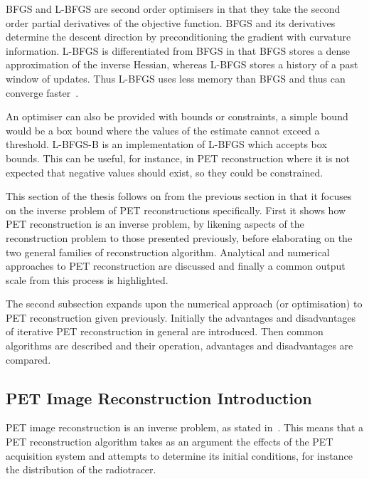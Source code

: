                 \gls{BFGS} and \gls{L-BFGS} are second order optimisers in that they take the second order partial derivatives of the objective function. \gls{BFGS} and its derivatives determine the descent direction by preconditioning the gradient with curvature information. \gls{L-BFGS} is differentiated from \gls{BFGS} in that \gls{BFGS} stores a dense approximation of the inverse Hessian, whereas \gls{L-BFGS} stores a history of a past window of updates. Thus \gls{L-BFGS} uses less memory than \gls{BFGS} and thus can converge faster~.
                
                An optimiser can also be provided with bounds or constraints, a simple bound would be a box bound where the values of the estimate cannot exceed a threshold. \gls{L-BFGS-B} is an implementation of \gls{L-BFGS} which accepts box bounds. This can be useful, for instance, in \gls{PET} reconstruction where it is not expected that negative values should exist, so they could be constrained.
            
        This section of the thesis follows on from the previous section in that it focuses on the inverse problem of \gls{PET} reconstructions specifically. First it shows how \gls{PET} reconstruction is an inverse problem, by likening aspects of the reconstruction problem to those presented previously, before elaborating on the two general families of reconstruction algorithm. Analytical and numerical approaches to \gls{PET} reconstruction are discussed and finally a common output scale from this process is highlighted.
            
        The second subsection expands upon the numerical approach (or optimisation) to \gls{PET} reconstruction given previously. Initially the advantages and disadvantages of iterative \gls{PET} reconstruction in general are introduced. Then common algorithms are described and their operation, advantages and disadvantages are compared. 
        
        \subsection{PET Image Reconstruction Introduction} \label{sec:analytic_image_reconstruction_introduction}
            \gls{PET} image reconstruction is an inverse problem, as stated in~. This means that a \gls{PET} reconstruction algorithm takes as an argument the effects of the \gls{PET} acquisition system and attempts to determine its initial conditions, for instance the distribution of the radiotracer.
            
